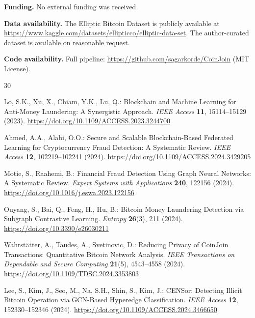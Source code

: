 \documentclass[12pt,a4paper]{article}
\begin{document}
\noindent\textbf{Funding.}
No external funding was received.

\noindent\textbf{Data availability.}
The Elliptic Bitcoin Dataset is publicly available at
\url{https://www.kaggle.com/datasets/ellipticco/elliptic-data-set}.
The author-curated dataset is available on reasonable request.

\noindent\textbf{Code availability.}
Full pipeline: \url{https://github.com/sagarkorde/CoinJoin}
(MIT License).

\begin{thebibliography}{30}

  Lo, S.K., Xu, X., Chiam, Y.K., Lu, Q.:
  Blockchain and Machine Learning for Anti-Money
  Laundering: A Synergistic Approach.
  \textit{IEEE Access} \textbf{11}, 15114--15129 (2023).
  \url{https://doi.org/10.1109/ACCESS.2023.3244700}

  Ahmed, A.A., Alabi, O.O.:
  Secure and Scalable Blockchain-Based Federated Learning
  for Cryptocurrency Fraud Detection: A Systematic Review.
  \textit{IEEE Access} \textbf{12}, 102219--102241 (2024).
  \url{https://doi.org/10.1109/ACCESS.2024.3429205}

  Motie, S., Raahemi, B.:
  Financial Fraud Detection Using Graph Neural Networks:
  A Systematic Review.
  \textit{Expert Systems with Applications} \textbf{240},
  122156 (2024).
  \url{https://doi.org/10.1016/j.eswa.2023.122156}

  Ouyang, S., Bai, Q., Feng, H., Hu, B.:
  Bitcoin Money Laundering Detection via Subgraph
  Contrastive Learning.
  \textit{Entropy} \textbf{26}(3), 211 (2024).
  \url{https://doi.org/10.3390/e26030211}

  Wahrst\"atter, A., Taudes, A., Svetinovic, D.:
  Reducing Privacy of CoinJoin Transactions: Quantitative
  Bitcoin Network Analysis.
  \textit{IEEE Transactions on Dependable and Secure
  Computing} \textbf{21}(5), 4543--4558 (2024).
  \url{https://doi.org/10.1109/TDSC.2024.3353803}

  Lee, S., Kim, J., Seo, M., Na, S.H., Shin, S., Kim, J.:
  CENSor: Detecting Illicit Bitcoin Operation via
  GCN-Based Hyperedge Classification.
  \textit{IEEE Access} \textbf{12}, 152330--152346 (2024).
  \url{https://doi.org/10.1109/ACCESS.2024.3466650}


\end{thebibliography}
\end{document}
